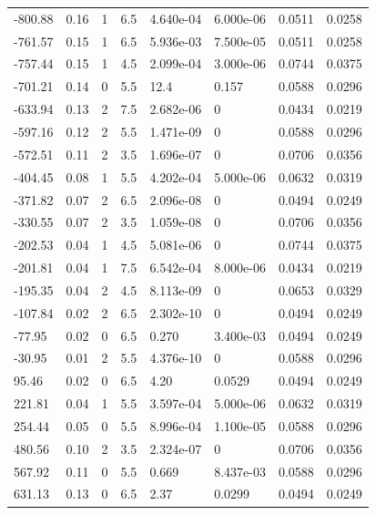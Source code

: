 \documentclass[preview]{standalone}
\begin{document}
{{\begin{tabular}{L{1.2cm}C{1.2cm} C{0.3cm}C{0.5cm} C{1.4cm}C{1.4cm} C{1.4cm}C{1.4cm}}
  -800.88  &  0.16  & 1     & 6.5 &  4.640e-04  & 6.000e-06  & 0.0511 &  0.0258   \\ 
  -761.57  &  0.15  & 1     & 6.5 &  5.936e-03  & 7.500e-05  & 0.0511 &  0.0258   \\ 
  -757.44  &  0.15  & 1     & 4.5 &  2.099e-04  & 3.000e-06  & 0.0744 &  0.0375   \\ 
  -701.21  &  0.14  & 0     & 5.5 &  12.4  & 0.157  & 0.0588 &  0.0296   \\ 
  -633.94  &  0.13  & 2     & 7.5 &  2.682e-06  & 0  & 0.0434 &  0.0219   \\ 
  -597.16  &  0.12  & 2     & 5.5 &  1.471e-09  & 0  & 0.0588 &  0.0296   \\ 
  -572.51  &  0.11  & 2     & 3.5 &  1.696e-07  & 0  & 0.0706 &  0.0356   \\ 
  -404.45  &  0.08  & 1     & 5.5 &  4.202e-04  & 5.000e-06  & 0.0632 &  0.0319   \\ 
  -371.82  &  0.07  & 2     & 6.5 &  2.096e-08  & 0  & 0.0494 &  0.0249   \\ 
  -330.55  &  0.07  & 2     & 3.5 &  1.059e-08  & 0  & 0.0706 &  0.0356   \\ 
  -202.53  &  0.04  & 1     & 4.5 &  5.081e-06  & 0  & 0.0744 &  0.0375   \\ 
  -201.81  &  0.04  & 1     & 7.5 &  6.542e-04  & 8.000e-06  & 0.0434 &  0.0219   \\ 
  -195.35  &  0.04  & 2     & 4.5 &  8.113e-09  & 0  & 0.0653 &  0.0329   \\ 
  -107.84  &  0.02  & 2     & 6.5 &  2.302e-10  & 0  & 0.0494 &  0.0249   \\ 
  -77.95  &  0.02  & 0     & 6.5 &  0.270  & 3.400e-03  & 0.0494 &  0.0249   \\ 
  -30.95  &  0.01  & 2     & 5.5 &  4.376e-10  & 0  & 0.0588 &  0.0296   \\ 
  95.46  &  0.02  & 0     & 6.5 &  4.20  & 0.0529  & 0.0494 &  0.0249   \\ 
  221.81  &  0.04  & 1     & 5.5 &  3.597e-04  & 5.000e-06  & 0.0632 &  0.0319   \\ 
  254.44  &  0.05  & 0     & 5.5 &  8.996e-04  & 1.100e-05  & 0.0588 &  0.0296   \\ 
  480.56  &  0.10  & 2     & 3.5 &  2.324e-07  & 0  & 0.0706 &  0.0356   \\ 
  567.92  &  0.11  & 0     & 5.5 &  0.669  & 8.437e-03  & 0.0588 &  0.0296   \\ 
  631.13  &  0.13  & 0     & 6.5 &  2.37  & 0.0299  & 0.0494 &  0.0249   \\ 

\end{tabular}}}
\end{document}
